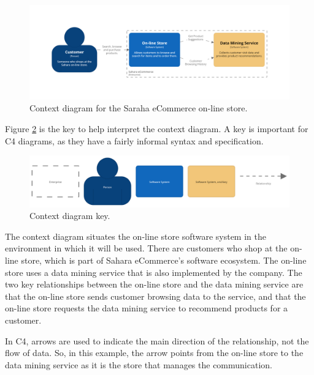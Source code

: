\begin{figure}[h]
  {
    \centering
    \includegraphics[trim=195 195 198 195,clip,width=\textwidth]{images/c4/context_diagram.png}
    \caption{Context diagram for the Saraha eCommerce on-line store.}
    \label{fig:c4_context}
  }
\end{figure}

\noindent
Figure \ref{fig:c4_context_key} is the key to help interpret the context diagram.
A key is important for C4 diagrams, as they have a fairly informal syntax and specification.

\begin{figure}[h]
  {
    \centering
    \begin{adjustwidth}{-7.5mm}{-7.5mm}
        \includegraphics[trim=20 15 20 18,clip,width=0.95\paperwidth]{images/c4/context_diagram-key.png}
    \end{adjustwidth}
    \caption{Context diagram key.}
    \label{fig:c4_context_key}
  }
\end{figure}

\noindent
The context diagram situates the on-line store software system in the environment in which it will be used.
There are customers who shop at the on-line store, which is part of Sahara eCommerce's software ecosystem.
The on-line store uses a data mining service that is also implemented by the company.
The two key relationships between the on-line store and the data mining service are 
that the on-line store sends customer browsing data to the service,
and that the on-line store requests the data mining service to recommend products for a customer.

In C4, arrows are used to indicate the main direction of the relationship, not the flow of data.
So, in this example, the arrow points from the on-line store to the data mining service as it is the store that manages the communication.

